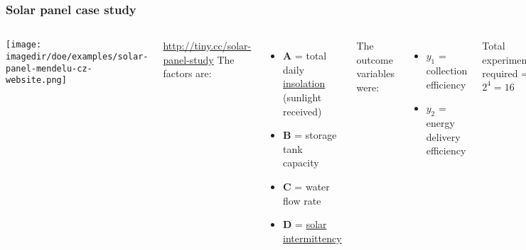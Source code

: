 \begin{frame}\frametitle{Solar panel case study}
	
	\begin{columns}[T]
			
			\texttt{[image: \\imagedir/doe/examples/solar-panel-mendelu-cz-website.png]}
			
			
			\href{http://tiny.cc/solar-panel-study}{http://tiny.cc/solar-panel-study}
			The factors are:
			\begin{itemize}
				\item	\textbf{A} = total daily \href{https://en.wikipedia.org/wiki/Insolation}{insolation} (sunlight received)
				\item	\textbf{B} = storage tank capacity
				\item	\textbf{C} = water flow rate
				\item	\textbf{D} = \href{https://en.wikipedia.org/wiki/Intermittent\_energy\_source }{solar intermittency}
			\end{itemize}
			\pause
			\vspace{12pt}
			The outcome variables were:
			\begin{itemize}
				\item	$y_1$ = collection efficiency
				\item	$y_2$ = energy delivery efficiency
			\end{itemize}
			\pause
			\vspace{12pt}
			Total experiments required = \pause $2^4 = 16$ 
			
	\end{columns}
\end{frame}

{
\begin{frame}\frametitle{}
\end{frame}}

{
\begin{frame}\frametitle{}
\end{frame}}

{
\begin{frame}\frametitle{}
\end{frame}}

